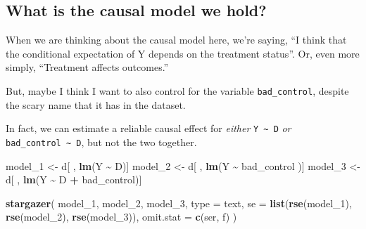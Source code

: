 \documentclass[
]{article}
\newenvironment{Shaded}{\begin{snugshade}}{\end{snugshade}}
\newcommand{\AttributeTok}[1]{\textcolor[rgb]{0.13,0.29,0.53}{#1}}
\newcommand{\FunctionTok}[1]{\textcolor[rgb]{0.13,0.29,0.53}{\textbf{#1}}}
\newcommand{\NormalTok}[1]{#1}
\newcommand{\OtherTok}[1]{\textcolor[rgb]{0.56,0.35,0.01}{#1}}
\newcommand{\SpecialCharTok}[1]{\textcolor[rgb]{0.81,0.36,0.00}{\textbf{#1}}}
\newcommand{\StringTok}[1]{\textcolor[rgb]{0.31,0.60,0.02}{#1}}
\theoremstyle{definition}
\theoremstyle{definition}
\theoremstyle{definition}
\theoremstyle{definition}
\theoremstyle{remark}
\begin{document}
\subsection{What is the causal model we hold?}\label{what-is-the-causal-model-we-hold}

When we are thinking about the causal model here, we're saying, ``I think that the conditional expectation of Y depends on the treatment status''. Or, even more simply, ``Treatment affects outcomes.''

But, maybe I think I want to also control for the variable \texttt{bad\_control}, despite the scary name that it has in the dataset.

In fact, we can estimate a reliable causal effect for \emph{either} \texttt{Y\ \textasciitilde{}\ D} \emph{or} \texttt{bad\_control\ \textasciitilde{}\ D}, but not the two together.

\begin{Shaded}
\begin{Highlighting}[]
\NormalTok{model\_1 }\OtherTok{\textless{}{-}}\NormalTok{ d[ , }\FunctionTok{lm}\NormalTok{(Y }\SpecialCharTok{\textasciitilde{}}\NormalTok{ D)]}
\NormalTok{model\_2 }\OtherTok{\textless{}{-}}\NormalTok{ d[ , }\FunctionTok{lm}\NormalTok{(Y }\SpecialCharTok{\textasciitilde{}}\NormalTok{ bad\_control )]}
\NormalTok{model\_3 }\OtherTok{\textless{}{-}}\NormalTok{ d[ , }\FunctionTok{lm}\NormalTok{(Y }\SpecialCharTok{\textasciitilde{}}\NormalTok{ D }\SpecialCharTok{+}\NormalTok{ bad\_control)]}
\end{Highlighting}
\end{Shaded}

\begin{Shaded}
\begin{Highlighting}[]
\FunctionTok{stargazer}\NormalTok{(}
\NormalTok{  model\_1, model\_2, model\_3, }
  \AttributeTok{type =} \StringTok{\textquotesingle{}text\textquotesingle{}}\NormalTok{, }
  \AttributeTok{se =} \FunctionTok{list}\NormalTok{(}\FunctionTok{rse}\NormalTok{(model\_1), }\FunctionTok{rse}\NormalTok{(model\_2), }\FunctionTok{rse}\NormalTok{(model\_3)),}
  \AttributeTok{omit.stat =} \FunctionTok{c}\NormalTok{(}\StringTok{\textquotesingle{}ser\textquotesingle{}}\NormalTok{, }\StringTok{\textquotesingle{}f\textquotesingle{}}\NormalTok{)}
\NormalTok{)}
\end{Highlighting}
\end{Shaded}
\end{document}
